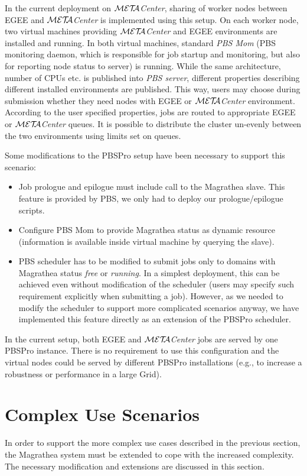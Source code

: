 \documentclass{sig-alternate}
\def\META#1{\textit{${\cal MET\!\!A}$#1}}
\begin{document}
In the current deployment on \META{Center}, sharing of worker nodes between EGEE and \META{Center} is implemented 
using this setup. On each worker node, two virtual machines providing
\META{Center} and EGEE environments are installed
and running. In both virtual machines, standard \textit{PBS Mom} (PBS monitoring daemon, which is responsible for job
startup and monitoring, but also for reporting node status to server) is running. While the same architecture, number 
of CPUs etc. is published into \textit{PBS server}, different properties
describing different installed environments
are published. This way, users may choose during submission whether they need nodes with EGEE or \META{Center}
environment. According to the user specified properties, jobs are routed
to appropriate EGEE or \META{Center} queues. 
It is possible to distribute the cluster un-evenly between the two
environments using limits set on queues.

Some modifications to the PBSPro setup have been necessary to support
this scenario:
\begin{itemize}
\item Job prologue and epilogue must include call to the Magrathea
slave. This feature is provided by 
PBS, we only had to deploy our prologue/epilogue scripts.
\item Configure PBS Mom to provide Magrathea status as dynamic resource (information is available inside virtual
machine by querying the slave).
\item PBS scheduler has to be modified to submit jobs only to domains
with Magrathea status \emph{free} or \emph{running}. In a simplest
deployment, this can be achieved even without modification of the scheduler (users may specify such requirement
explicitly when submitting a job).  However, as we needed to modify the scheduler to support more complicated scenarios 
anyway, we have implemented this feature directly as an extension of the
PBSPro scheduler.
\end{itemize}

In the current setup, both EGEE and \META{Center} jobs are served by one
PBSPro instance. There is no requirement to use this configuration and
the virtual nodes could be served by different PBSPro installations
(e.g., to increase a robustness or performance in a large Grid).

\section{Complex Use Scenarios}
In order to support the more complex use cases described in the previous
section, the Magrathea system must be extended to cope with the increased
complexity. The necessary modification and extensions are discussed in
this section.
\end{document}
